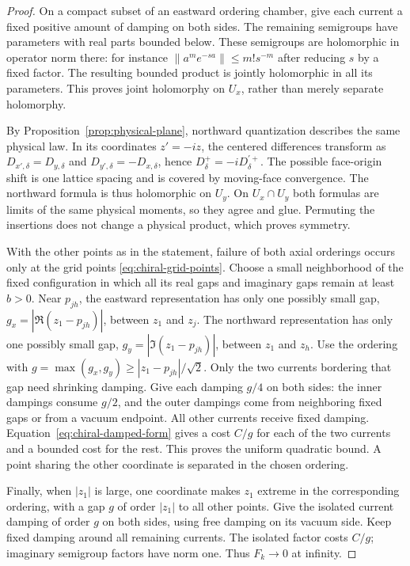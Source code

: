\begin{proof}
On a compact subset of an eastward ordering chamber, give each current
a fixed positive amount of damping on both sides. The remaining
semigroups have parameters with real parts bounded below. These
semigroups are holomorphic in operator norm there: for instance
$\|a^m e^{-sa}\|\le m!s^{-m}$ after reducing $s$ by a fixed factor.
The resulting bounded product is jointly holomorphic in all its
parameters. This proves joint holomorphy on $U_x$, rather than merely
separate holomorphy.

By Proposition~\ref{prop:physical-plane}, northward quantization describes
the same physical law. In its coordinates $z'=-iz$, the centered
differences transform as
$D_{x',\delta}=D_{y,\delta}$ and
$D_{y',\delta}=-D_{x,\delta}$, hence
$D_\delta^+=-iD_\delta^{\prime+}$. The possible face-origin shift is
one lattice spacing and is covered by moving-face convergence. The
northward formula is thus holomorphic on $U_y$. On $U_x\cap U_y$
both formulas are limits of the same physical moments, so they agree
and glue. Permuting the insertions does not change a physical product,
which proves symmetry.

With the other points as in the statement, failure of both axial
orderings occurs only at the grid points \eqref{eq:chiral-grid-points}.
Choose a small neighborhood of the fixed configuration in which all
its real gaps and imaginary gaps remain at least $b>0$. Near $p_{jh}$,
the eastward representation has only one possibly small gap,
$g_x=|\Re(z_1-p_{jh})|$, between $z_1$ and $z_j$.
The northward representation has only one possibly small gap,
$g_y=|\Im(z_1-p_{jh})|$, between $z_1$ and $z_h$.
Use the ordering with $g=\max(g_x,g_y)\ge|z_1-p_{jh}|/\sqrt2$.
Only the two currents bordering that gap need shrinking damping.
Give each damping $g/4$ on both sides: the inner dampings consume
$g/2$, and the outer dampings come from neighboring fixed gaps or
from a vacuum endpoint. All other currents receive fixed damping.
Equation~\eqref{eq:chiral-damped-form} gives a cost $C/g$ for each
of the two currents and a bounded cost for the rest. This proves
the uniform quadratic bound. A point sharing the other coordinate
is separated in the chosen ordering.

Finally, when $|z_1|$ is large, one coordinate makes $z_1$ extreme in
the corresponding ordering, with a gap $g$ of order $|z_1|$ to all
other points. Give the isolated current damping of order $g$ on both
sides, using free damping on its vacuum side. Keep fixed damping
around all remaining currents. The isolated factor costs $C/g$;
imaginary semigroup factors have norm one. Thus $F_k\to0$ at infinity.
\end{proof}

